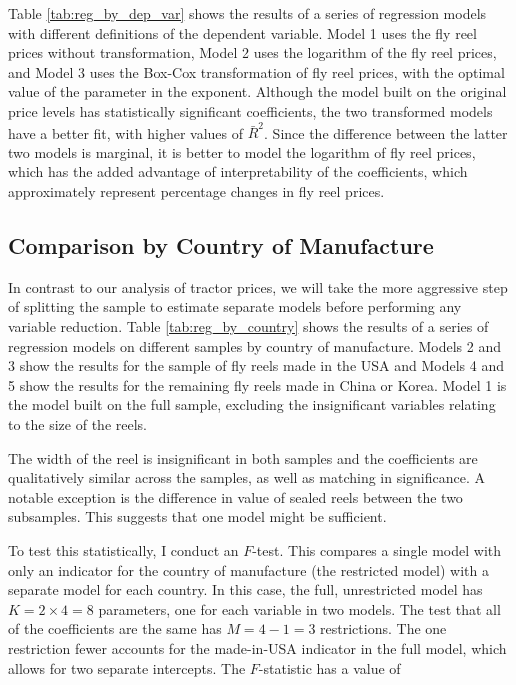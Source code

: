 \documentclass[11pt]{paper}
\begin{document}
Table \ref{tab:reg_by_dep_var} shows the results of 
a series of regression models with different definitions of the dependent variable.
Model 1 uses the fly reel prices without transformation, 
Model 2 uses the logarithm of the fly reel prices, 
and Model 3 uses the Box-Cox transformation of fly reel prices, 
with the optimal value of the parameter in the exponent.
% 
Although the model built on the original price levels
has statistically significant coefficients, 
the two transformed models have a better fit, 
with higher values of $\bar{R}^2$. 
Since the difference between the latter two models is marginal, 
it is better to model the logarithm of fly reel prices, 
which has the added advantage of interpretability 
of the coefficients, 
which approximately represent percentage changes in fly reel prices. 



\pagebreak
\subsection{Comparison by Country of Manufacture}

In contrast to our analysis of tractor prices, 
we will take the more aggressive step of 
splitting the sample to estimate separate models before performing any variable reduction.
% 
Table \ref{tab:reg_by_country} shows the results of 
a series of regression models 
on different samples by country of manufacture.
Models 2 and 3 show the results for the sample of fly reels made in the USA
and Models 4 and 5 show the results for the remaining fly reels made in China or Korea.
Model 1 is the model built on the full sample, 
excluding the insignificant variables relating to the size of the reels. 



The width of the reel is insignificant in both samples
and the coefficients are qualitatively similar across the samples, as well as matching in significance. 
A notable exception is the difference in value 
of sealed reels between the two subsamples. 
This suggests that one model might be sufficient. 

To test this statistically, I conduct an $F$-test. 
This compares a single model with only an
indicator for the country of manufacture
(the restricted model)
with a separate model for each country.
In this case, the full, unrestricted model has 
$K = 2\times4 = 8$ parameters, one for each variable in two models. 
The test that all of the coefficients are the same has 
$M = 4 - 1 = 3$
restrictions. 
The one restriction fewer accounts for the made-in-USA indicator
in the full model, 
which allows for two separate intercepts. 
% 
The $F$-statistic has a value of 
\end{document}
